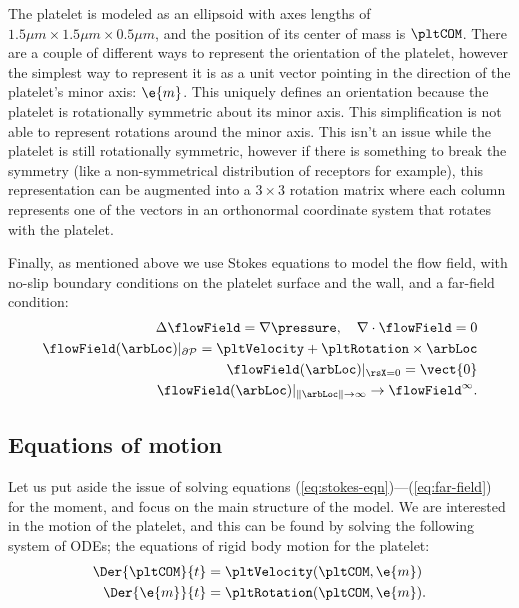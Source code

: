 The platelet is modeled as an ellipsoid with axes lengths of
$1.5 \mu m \times 1.5 \mu m \times 0.5 \mu m$, and the position of its
center of mass is $\pltCOM$. There are a couple of different ways to
represent the orientation of the platelet, however the simplest way to
represent it is as a unit vector pointing in the direction of the
platelet's minor axis: $\e{m}$. This uniquely defines an orientation
because the platelet is rotationally symmetric about its minor
axis. This simplification is not able to represent rotations around
the minor axis. This isn't an issue while the platelet is still
rotationally symmetric, however if there is something to break the
symmetry (like a non-symmetrical distribution of receptors for
example), this representation can be augmented into a $3 \times 3$
rotation matrix where each column represents one of the vectors in an
orthonormal coordinate system that rotates with the platelet.

Finally, as mentioned above we use Stokes equations to model the flow
field, with no-slip boundary conditions on the platelet surface and
the wall, and a far-field condition:
\begin{align}
  \Delta \flowField = \nabla \pressure, \quad \nabla \cdot \flowField
  = 0 \label{eq:stokes-eqn} \\
  \flowField(\arbLoc)|_{\partial\mathcal{P}} = \pltVelocity +
  \pltRotation \times \arbLoc \label{eq:plt-bc} \\
  \flowField(\arbLoc)|_{\rsX = 0} =
  \vect{0} \label{eq:wall-bc} \\
  \flowField(\arbLoc)|_{\|\arbLoc\| \rightarrow \infty}
  \rightarrow \flowField^\infty. \label{eq:far-field}
\end{align}

\subsection{Equations of motion}
\label{sec:equations-motion}

Let us put aside the issue of solving equations
(\ref{eq:stokes-eqn})---(\ref{eq:far-field}) for the moment, and focus
on the main structure of the model. We are interested in the motion of
the platelet, and this can be found by solving the following system of
ODEs; the equations of rigid body motion for the platelet:
\begin{align}
  \Der{\pltCOM}{t} &= \pltVelocity(\pltCOM,
                     \e{m}) \label{eq:plt-velocity} \\
  \Der{\e{m}}{t} &= \pltRotation(\pltCOM,
                   \e{m}). \label{eq:plt-rotation} 
\end{align}

